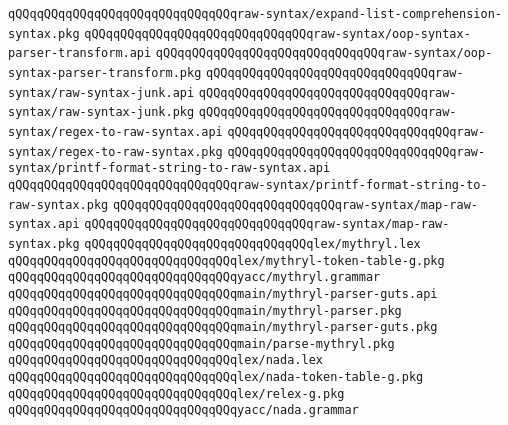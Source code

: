 \verb|qQQqqQQqqQQqqQQqqQQqqQQqqQQqqQQqraw-syntax/expand-list-comprehension-syntax.pkg|\newline
\verb|qQQqqQQqqQQqqQQqqQQqqQQqqQQqqQQqraw-syntax/oop-syntax-parser-transform.api|\newline
\verb|qQQqqQQqqQQqqQQqqQQqqQQqqQQqqQQqraw-syntax/oop-syntax-parser-transform.pkg|\newline
\verb|qQQqqQQqqQQqqQQqqQQqqQQqqQQqqQQqraw-syntax/raw-syntax-junk.api|\newline
\verb|qQQqqQQqqQQqqQQqqQQqqQQqqQQqqQQqraw-syntax/raw-syntax-junk.pkg|\newline
\verb|qQQqqQQqqQQqqQQqqQQqqQQqqQQqqQQqraw-syntax/regex-to-raw-syntax.api|\newline
\verb|qQQqqQQqqQQqqQQqqQQqqQQqqQQqqQQqraw-syntax/regex-to-raw-syntax.pkg|\newline
\verb|qQQqqQQqqQQqqQQqqQQqqQQqqQQqqQQqraw-syntax/printf-format-string-to-raw-syntax.api|\newline
\verb|qQQqqQQqqQQqqQQqqQQqqQQqqQQqqQQqraw-syntax/printf-format-string-to-raw-syntax.pkg|\newline
\verb|qQQqqQQqqQQqqQQqqQQqqQQqqQQqqQQqraw-syntax/map-raw-syntax.api|\newline
\verb|qQQqqQQqqQQqqQQqqQQqqQQqqQQqqQQqraw-syntax/map-raw-syntax.pkg|\newline
\newline
\verb|qQQqqQQqqQQqqQQqqQQqqQQqqQQqqQQqlex/mythryl.lex|\newline
\verb|qQQqqQQqqQQqqQQqqQQqqQQqqQQqqQQqlex/mythryl-token-table-g.pkg|\newline
\verb|qQQqqQQqqQQqqQQqqQQqqQQqqQQqqQQqyacc/mythryl.grammar|\newline
\verb|qQQqqQQqqQQqqQQqqQQqqQQqqQQqqQQqmain/mythryl-parser-guts.api|\newline
\verb|qQQqqQQqqQQqqQQqqQQqqQQqqQQqqQQqmain/mythryl-parser.pkg|\newline
\verb|qQQqqQQqqQQqqQQqqQQqqQQqqQQqqQQqmain/mythryl-parser-guts.pkg|\newline
\verb|qQQqqQQqqQQqqQQqqQQqqQQqqQQqqQQqmain/parse-mythryl.pkg|\newline
\newline
\verb|qQQqqQQqqQQqqQQqqQQqqQQqqQQqqQQqlex/nada.lex|\newline
\verb|qQQqqQQqqQQqqQQqqQQqqQQqqQQqqQQqlex/nada-token-table-g.pkg|\newline
\verb|qQQqqQQqqQQqqQQqqQQqqQQqqQQqqQQqlex/relex-g.pkg|\newline
\verb|qQQqqQQqqQQqqQQqqQQqqQQqqQQqqQQqyacc/nada.grammar|\newline
